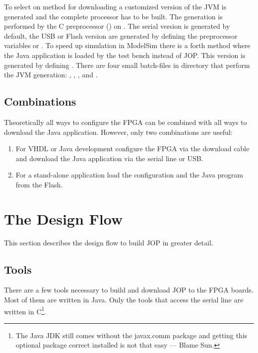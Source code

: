To select on method for downloading a customized version of the JVM
is generated and the complete processor has to be built. The
generation is performed by the C preprocessor () on
. The serial version is generated by default, the USB
or Flash version are generated by defining the preprocessor
variables  or . To speed up simulation in
ModelSim there is a forth method where the Java application is
loaded by the test bench instead of JOP. This version is generated
by defining . There are four small batch-files in
directory  that perform the JVM generation:
, , , and .

\subsection{Combinations}

Theoretically all ways to configure the FPGA can be combined with
all ways to download the Java application. However, only two
combinations are useful:

\begin{enumerate}
    \item For VHDL or Java development configure the FPGA
    via the download cable and download the Java application
    via the serial line or USB.
    \item For a stand-alone application load the configuration and
    the Java program from the Flash.
\end{enumerate}



\section{The Design Flow}

This section describes the design flow to build JOP in greater
detail.

\subsection{Tools}

There are a few tools necessary to build and download JOP to the
FPGA boards. Most of them are written in Java. Only the tools that
access the serial line are written in C\footnote{The Java JDK still
comes without the javax.comm package and getting this optional
package correct installed is not that easy --- Blame Sun.}.

